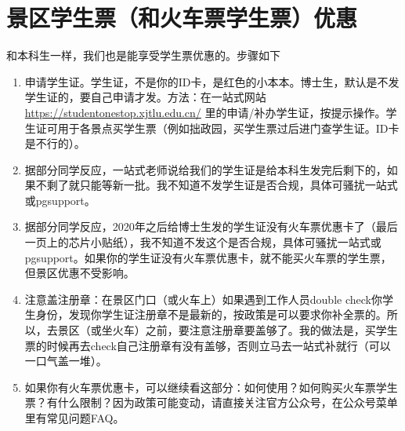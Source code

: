 \section{景区学生票（和火车票学生票）优惠}


和本科生一样，我们也是能享受学生票优惠的。步骤如下

\begin{enumerate}
    \item 申请学生证。学生证，不是你的ID卡，是红色的小本本。博士生，默认是不发学生证的，要自己申请才发。方法：在一站式网站 \url{https://studentonestop.xjtlu.edu.cn/} 里的申请/补办学生证，按提示操作。学生证可用于各景点买学生票（例如拙政园，买学生票过后进门查学生证。ID卡是不行的）。
    \item 据部分同学反应，一站式老师说给我们的学生证是给本科生发完后剩下的，如果不剩了就只能等新一批。我不知道不发学生证是否合规，具体可骚扰一站式或pgsupport。
    \item 据部分同学反应，2020年之后给博士生发的学生证没有火车票优惠卡了（最后一页上的芯片小贴纸），我不知道不发这个是否合规，具体可骚扰一站式或pgsupport。如果你的学生证没有火车票优惠卡，就不能买火车票的学生票，但景区优惠不受影响。
    \item 注意盖注册章：在景区门口（或火车上）如果遇到工作人员double check你学生身份，发现你学生证注册章不是最新的，按政策是可以要求你补全票的。所以，去景区（或坐火车）之前，要注意注册章要盖够了。我的做法是，买学生票的时候再去check自己注册章有没有盖够，否则立马去一站式补就行（可以一口气盖一堆）。
    \item 
        \begin{minipage}{0.71\textwidth}
            如果你有火车票优惠卡，可以继续看这部分：如何使用？如何购买火车票学生票？有什么限制？因为政策可能变动，请直接关注官方公众号，在公众号菜单里有常见问题FAQ。
        \end{minipage}
        \begin{minipage}{0.2\textwidth}
            \begin{figure}[H]

\end{figure}
\end{minipage}
\end{enumerate}
